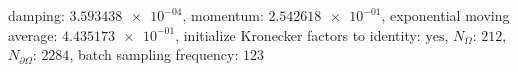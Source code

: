 damping: $\num[scientific-notation=true]{3.593438e-04}$, momentum: $\num[scientific-notation=true]{2.542618e-01}$, exponential moving average: $\num[scientific-notation=true]{4.435173e-01}$, initialize Kronecker factors to identity: $\text{yes}$, $N_{\Omega}$: $\num[scientific-notation=false]{212}$, $N_{\partial\Omega}$: $\num[scientific-notation=false]{2284}$, batch sampling frequency: $\num[scientific-notation=false]{123}$